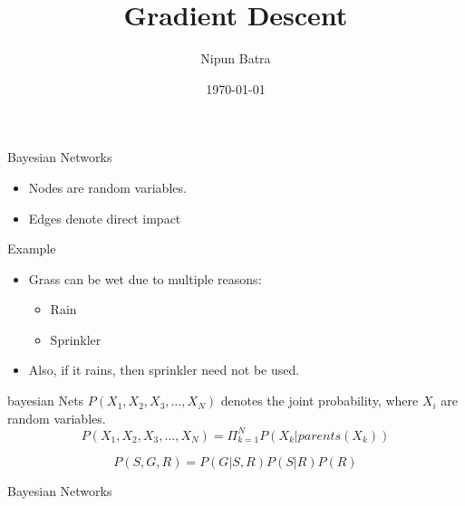 \documentclass{beamer}
\title{Gradient Descent}
\date{\today}
\author{Nipun Batra}
\institute{IIT Gandhinagar}
\begin{document}
  \maketitle
  
  
  

\begin{frame}{Bayesian Networks}
\begin{itemize}
	
	
	\item Nodes are random variables.
	\item Edges denote direct impact

	
\end{itemize}
\end{frame}

\begin{frame}{Example}
\begin{itemize}

\item Grass can be wet due to multiple reasons:
\begin{itemize}
    \item Rain
    \item Sprinkler
\end{itemize}
\item Also, if it rains, then sprinkler need not be used.
\end{itemize}

    


	

\end{frame}

\begin{frame}{bayesian Nets}
    $P(X_{1},X_{2},X_{3},\dots,X_{N})$ denotes the joint probability, where $X_{i}$ are random variables.
    \begin{equation*}
        P(X_{1},X_{2},X_{3},\dots,X_{N}) = \Pi_{k=1}^{N} P(X_{k} | parents(X_{k}))
    \end{equation*}
    
    
    \begin{equation*}
        P(S,G,R) =  P(G|S,R)P(S|R)P(R)
    \end{equation*}
    
\end{frame}


\begin{frame}{Bayesian Networks}
\end{frame}
\end{document}

